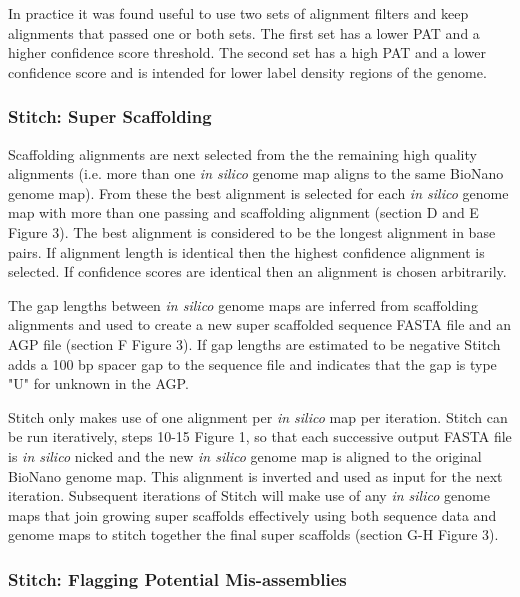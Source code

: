 \documentclass{bmcart}
\begin{document}
In practice it was found useful to use two sets of alignment filters and keep alignments that passed one or both sets. The first set has a lower PAT and a higher confidence score threshold. The second set has a high PAT and a lower confidence score and is intended for lower label density regions of the genome.

\subsubsection*{Stitch: Super Scaffolding}

Scaffolding alignments are next selected from the the remaining high quality alignments (i.e. more than one \textit{in silico} genome map aligns to the same BioNano genome map). From these the best alignment is selected for each \textit{in silico} genome map with more than one passing and scaffolding alignment (section D and E Figure 3). The best alignment is considered to be the longest alignment in base pairs. If alignment length is identical then the highest confidence alignment is selected. If confidence scores are identical then an alignment is chosen arbitrarily.

The gap lengths between \textit{in silico} genome maps are inferred from scaffolding alignments and used to create a new super scaffolded sequence FASTA file and an AGP file (section F Figure 3). If gap lengths are estimated to be negative Stitch adds a 100 bp spacer gap to the sequence file and indicates that the gap is type "U" for unknown in the AGP. 

Stitch only makes use of one alignment per \textit{in silico} map per iteration. Stitch can be run iteratively, steps 10-15 Figure 1, so that each successive output FASTA file is \textit{in silico} nicked and the new \textit{in silico} genome map is aligned to the original BioNano genome map. This alignment is inverted and used as input for the next iteration. Subsequent iterations of Stitch will make use of any \textit{in silico} genome maps that join growing super scaffolds effectively using both sequence data and genome maps to stitch together the final super scaffolds (section G-H Figure 3). 

\subsubsection*{Stitch: Flagging Potential Mis-assemblies}
\end{document}
